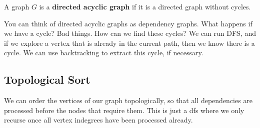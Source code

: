 \begin{definition}
	A graph \( G \) is a \textbf{directed acyclic graph} if it is a directed graph without cycles.
\end{definition}

You can think of directed acyclic graphs as dependency graphs. What happens if we have a cycle? Bad things. How can we find these cycles? We can run DFS, and if we explore a vertex that is already in the current path, then we know there is a cycle. We can use backtracking to extract this cycle, if necessary.

\subsection{Topological Sort}
We can order the vertices of our graph topologically, so that all dependencies are processed before the nodes that require them. This is just a dfs where we only recurse once all vertex indegrees have been processed already.
